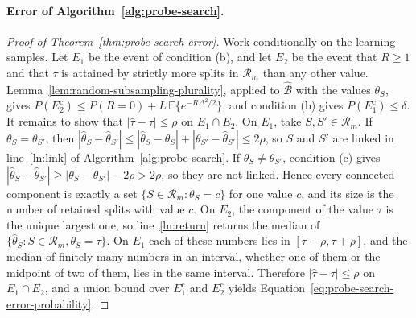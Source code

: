 \paragraph[Error of Algorithm 1.]{ Error of Algorithm~\ref{alg:probe-search}.}
\begin{proof}[ Proof of Theorem~\ref{thm:probe-search-error}]

Work conditionally on the learning samples. Let $E_1$ be the event of condition (b), and let $E_2$ be the event that $R\ge1$ and that $\tau$ is attained by strictly more splits in $\mathcal R_m$ than any other value. Lemma~\ref{lem:random-subsampling-plurality}, applied to $\widehat{\mathcal B}$ with the values $\theta_S$, gives $P(E_2^{\mathrm c})\le P(R=0)+L\,\mathbb E\{e^{-R\Delta^2/2}\}$, and condition (b) gives $P(E_1^{\mathrm c})\le\delta$. It remains to show that $|\widehat\tau-\tau|\le\rho$ on $E_1\cap E_2$. On $E_1$, take $S,S'\in\mathcal R_m$. If $\theta_S=\theta_{S'}$, then $|\widehat\theta_S-\widehat\theta_{S'}|\le|\widehat\theta_S-\theta_S|+|\theta_{S'}-\widehat\theta_{S'}|\le2\rho$, so $S$ and $S'$ are linked in line~\ref{ln:link} of Algorithm~\ref{alg:probe-search}. If $\theta_S\ne\theta_{S'}$, condition (c) gives $|\widehat\theta_S-\widehat\theta_{S'}|\ge|\theta_S-\theta_{S'}|-2\rho>2\rho$, so they are not linked. Hence every connected component is exactly a set $\{S\in\mathcal R_m:\theta_S=c\}$ for one value $c$, and its size is the number of retained splits with value $c$. On $E_2$, the component of the value $\tau$ is the unique largest one, so line~\ref{ln:return} returns the median of $\{\widehat\theta_S:S\in\mathcal R_m,\theta_S=\tau\}$. On $E_1$ each of these numbers lies in $[\tau-\rho,\tau+\rho]$, and the median of finitely many numbers in an interval, whether one of them or the midpoint of two of them, lies in the same interval. Therefore $|\widehat\tau-\tau|\le\rho$ on $E_1\cap E_2$, and a union bound over $E_1^{\mathrm c}$ and $E_2^{\mathrm c}$ yields Equation~\eqref{eq:probe-search-error-probability}.
\end{proof}

